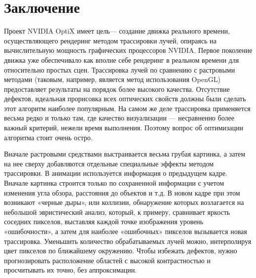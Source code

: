 \section{Заключение}
Проект NVIDIA OptiX имеет цель--- создание движка реального времени, осуществляющего рендеринг методом трассировки лучей, опираясь на вычислительную мощность графических процессоров NVIDIA. Первое поколение движка уже обеспечивало как вполне себе рендеринг в реальном времени для относительно простых сцен.
Трассировка лучей по сравнению с растровыми методами (таковым, например, является метод использования OpenGL) предоставляет результаты на порядок более высокого качества. Отсутствие дефектов, идеальная прорисовка всех оптических свойств должны были сделать этот алгоритм наиболее популярным. На самом же деле трассировка применяется весьма редко и только там, где качество визуализации — несравненно более важный критерий, нежели время выполнения. Поэтому вопрос об оптимизации алгоритма стоит очень остро.

Вначале растровыми средствами выстраивается весьма грубая картинка, а затем на нее сверху добавляются отдельные специальные эффекты методом трассировки. 
В анимации используется информация о предыдущем кадре. Вначале картинка строится только по сохраненной информации с учетом изменения угла обзора, расстояния до объектов и т.д. В новом кадре при этом возникают «черные дыры», или коллизии, обнаружение которых возлагается на небольшой эвристический анализ, который, к примеру, сравнивает яркость соседних пикселов, выставляя каждой точке изображения уровень «ошибочности», а затем для наиболее «ошибочных» пикселов вызывается новая трассировка.
Уменьшить количество обрабатываемых лучей можно, интерполируя цвет пикселов по ближайшему окружению. Чтобы избежать дефектов, нужно прогнозировать расположение областей с высокой контрастностью и просчитывать их точно, без аппроксимации.
